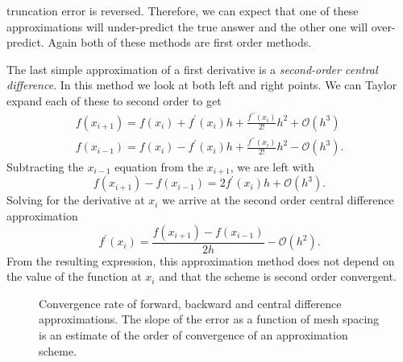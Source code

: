 truncation error is reversed. Therefore, we can expect that one of these approximations will under-predict the true answer
and the other one will over-predict. Again both of these methods are first order methods.
\par 
The last simple approximation of a first derivative is a \emph{second-order central difference}. In this method we look 
at both left and right points. We can Taylor expand each of these to second order to get
\begin{eqnarray}
    f\left(x_{i+1}\right) = f\left(x_{i}\right) + f^{\prime}\left(x_{i}\right)h + \frac{f^{\prime\prime}\left(x_{i}\right)}{2!}h^{2} + \mathcal{O}\left(h^{3}\right) \\
    f\left(x_{i-1}\right) = f\left(x_{i}\right) - f^{\prime}\left(x_{i}\right)h + \frac{f^{\prime\prime}\left(x_{i}\right)}{2!}h^{2} - \mathcal{O}\left(h^{3}\right).
\end{eqnarray}
Subtracting the $x_{i-1}$ equation from the $x_{i+1}$, we are left with
\begin{equation}
    f\left(x_{i+1}\right) - f\left(x_{i-1}\right) = 2f^{\prime}\left(x_{i}\right)h  + \mathcal{O}\left(h^{3}\right).
\end{equation}
Solving for the derivative at $x_{i}$ we arrive at the second order central difference approximation
\begin{equation}
    f^{\prime}\left(x_{i}\right) = \frac{f\left(x_{i+1}\right) - f\left(x_{i-1}\right)}{2h} - \mathcal{O}\left(h^{2}\right).
\end{equation}
From the resulting expression, this approximation method does not depend on the value of the function at $x_{i}$ and that
the scheme is second order convergent.
\par
\begin{figure}[t]
\sidecaption[t]
\scalebox{0.5}{}
\caption{Convergence rate of forward, backward and central difference approximations. The slope of the error as a function of mesh spacing
is an estimate of the order of convergence of an approximation scheme.}
\label{fig:fdm_convergence}       %
\end{figure}
